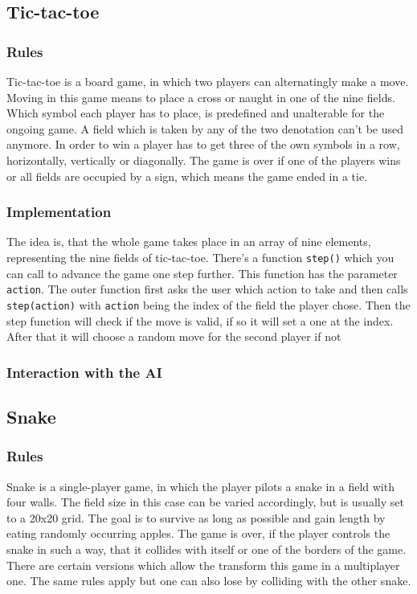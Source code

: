 \documentclass[12pt]{article}
\begin{document}
\subsection{Tic-tac-toe}
\subsubsection{Rules}
Tic-tac-toe is a board game, in which two players can alternatingly make a move. Moving in this game means to place a cross or naught in one of the nine fields. Which symbol each player has to place, is predefined and unalterable for the ongoing game. A field which is taken by any of the two denotation can't be used anymore. In order to win a player has to get three of the own symbols in a row, horizontally, vertically or diagonally. The game is over if one of the players wins or all fields are occupied by a sign, which means the game ended in a tie.
\subsubsection{Implementation}
The idea is, that the whole game takes place in an array of nine elements, representing the nine fields of tic-tac-toe. There's a function \lstinline{step()} which you can call to advance the game one step further. This function has the parameter \lstinline{action}. The outer function first asks the user which action to take and then calls \lstinline{step(action)} with \lstinline{action} being the index of the field the player chose. Then the step function will check if the move is valid, if so it will set a one at the index. After that it will choose a random move for the second player if not 
\subsubsection{Interaction with the AI}
\subsection{Snake}
\subsubsection{Rules}
Snake is a single-player game, in which the player pilots a snake in a field with four walls. The field size in this case can be varied accordingly, but is usually set to a 20x20 grid. The goal is to survive as long as possible and gain length by eating randomly occurring apples. The game is over, if the player controls the snake in such a way, that it collides with itself or one of the borders of the game. There are certain versions which allow the transform this game in a multiplayer one. The same rules apply but one can also lose by colliding with the other snake.
\end{document}

